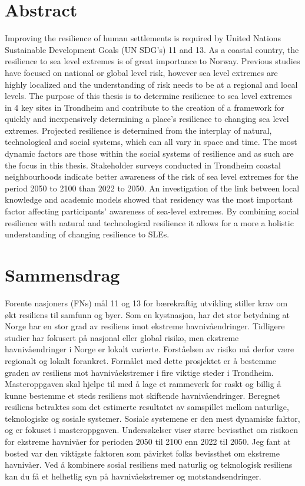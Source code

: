 


\section{Abstract}

Improving the resilience of human settlements is required by United Nations Sustainable Development Goals (UN SDG's) 11 and 13. As a coastal country, the resilience to sea level extremes is of great importance to Norway. Previous studies have focused on national or global level risk, however sea level extremes are highly localized  and the understanding of risk needs to be at a regional and local levels. The purpose of this thesis is to determine resilience to sea level extremes in 4 key sites in Trondheim and contribute to the creation of a framework for quickly and inexpensively determining a place's resilience to changing sea level extremes. Projected resilience is determined from the interplay of natural, technological and social systems, which can all vary in space and time. The most dynamic factors are those within the social systems of resilience and as such are the focus in this thesis. Stakeholder surveys conducted in Trondheim coastal neighbourhoods indicate better awareness of the risk of sea level extremes for the period 2050 to 2100 than 2022 to 2050. An  investigation of the link between local knowledge and academic models showed that residency was the most important factor affecting participants' awareness of sea-level extremes.  By combining social resilience with natural and technological resilience it allows for a more a holistic understanding of changing resilience to SLEs.
   

\newpage

\section{Sammensdrag}
Forente nasjoners (FNs) mål 11 og 13 for bærekraftig utvikling stiller krav om økt resiliens til samfunn og byer. Som en kystnasjon, har det stor betydning at Norge har en stor grad av resiliens imot ekstreme havnivåendringer. Tidligere studier har fokusert på nasjonal eller global risiko, men ekstreme havnivåendringer i Norge er lokalt varierte. Forståelsen av risiko må derfor være regionalt og lokalt forankret. Formålet med dette prosjektet er å bestemme graden av resiliens mot havnivåekstremer i fire viktige steder i Trondheim. Masteroppgaven skal hjelpe til med å lage et rammeverk for raskt og billig å kunne bestemme et steds resiliens mot skiftende havnivåendringer. Beregnet resiliens betraktes som det estimerte resultatet av samspillet mellom naturlige, teknologiske og sosiale systemer. Sosiale systemene er den mest dynamiske faktor, og er fokuset i masteroppgaven. Undersøkelser viser større bevissthet om risikoen for ekstreme havnivåer for perioden 2050 til 2100 enn 2022 til 2050. Jeg fant at bosted var den viktigste faktoren som påvirket folks bevissthet om ekstreme havnivåer. Ved å kombinere sosial resiliens med naturlig og teknologisk resiliens kan du få et helhetlig syn på havnivåekstremer og motstandsendringer.